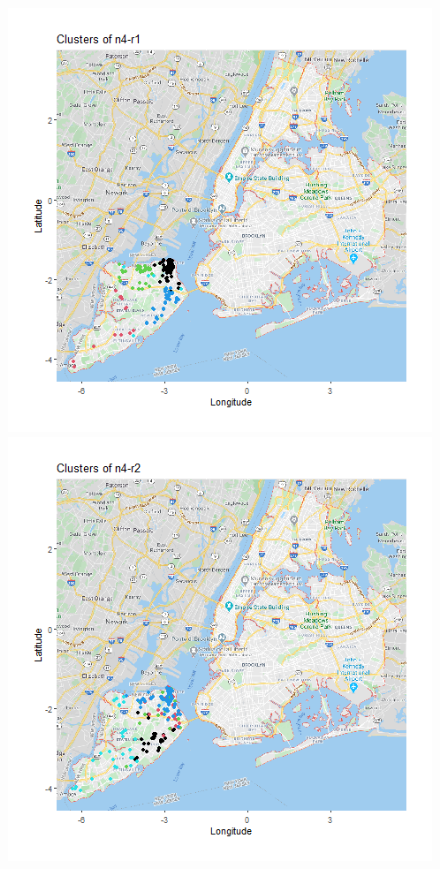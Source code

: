 \documentclass{FR16}
\begin{document}
\begin{itemize}
\begin{itemize}
\end{itemize}


\begin{figure}[!htb]
   \begin{minipage}{0.33\textwidth}
     \centering
     \includegraphics[width=1\linewidth]{figures/clust-n4-r1.png} 
   \end{minipage}\hfill
   \begin{minipage}{0.33\textwidth}
     \centering
     \includegraphics[width=1\linewidth]{figures/clust-n4-r2.png}

\end{minipage}
\end{figure}
\end{itemize}
\end{document}
